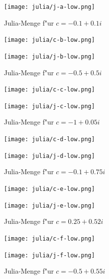 \begin{refsection}
\begin{figure}
\begin{center}
\texttt{[image: julia/j-a-low.png]}
\end{center}
\caption{Julia-Menge f"ur $c= -0.1+0.1i$\label{julia:a}}
\end{figure}

\begin{figure}
\begin{center}
\texttt{[image: julia/c-b-low.png]}

\bigskip

\texttt{[image: julia/j-b-low.png]}
\end{center}
\caption{Julia-Menge f"ur $c= -0.5+0.5i$\label{julia:b}}
\end{figure}

\begin{figure}
\begin{center}
\texttt{[image: julia/c-c-low.png]}

\bigskip

\texttt{[image: julia/j-c-low.png]}
\end{center}
\caption{Julia-Menge f"ur $c= -1+0.05i$\label{julia:c}}
\end{figure}

\begin{figure}
\begin{center}
\texttt{[image: julia/c-d-low.png]}

\bigskip

\texttt{[image: julia/j-d-low.png]}
\end{center}
\caption{Julia-Menge f"ur $c= -0.1+0.75i$\label{julia:d}}
\end{figure}

\begin{figure}
\begin{center}
\texttt{[image: julia/c-e-low.png]}

\bigskip

\texttt{[image: julia/j-e-low.png]}
\end{center}
\caption{Julia-Menge f"ur $c= 0.25+0.52i$\label{julia:e}}
\end{figure}

\begin{figure}
\begin{center}
\texttt{[image: julia/c-f-low.png]}

\bigskip

\texttt{[image: julia/j-f-low.png]}
\end{center}
\caption{Julia-Menge f"ur $c= -0.5+0.55i$\label{julia:f}}
\end{figure}


\end{refsection}

